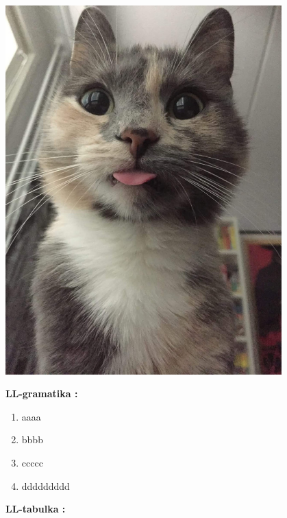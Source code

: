 \documentclass[12pt]{article}
\begin{document}
\includegraphics[width=0.8\textwidth,scale=0.5]{cato}

\newpage

 \Large \textbf{LL-gramatika :} \\ \normalsize
\noindent\makebox[\linewidth]{\rule{\textwidth}{0.4pt}}
\begin{enumerate}
\item aaaa
\item bbbb
\item ccccc
\item ddddddddd
\end{enumerate}


 \Large \textbf{LL-tabulka :}
\newline \\
\end{document}
